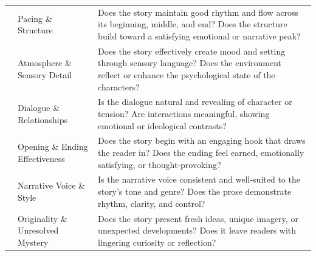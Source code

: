\documentclass{article}
\theoremstyle{plain}
\theoremstyle{definition}
\theoremstyle{remark}
\begin{document}
\begin{table}[t]
\begin{tabular}{clp{10cm}}
\addlinespace
700 & Pacing \& Structure & Does the story maintain good rhythm and flow across its beginning, middle, and end? Does the structure build toward a satisfying emotional or narrative peak? \\
\addlinespace
800 & Atmosphere \& Sensory Detail & Does the story effectively create mood and setting through sensory language? Does the environment reflect or enhance the psychological state of the characters? \\
\addlinespace
900 & Dialogue \& Relationships & Is the dialogue natural and revealing of character or tension? Are interactions meaningful, showing emotional or ideological contrasts? \\
\addlinespace
1000 & Opening \& Ending Effectiveness & Does the story begin with an engaging hook that draws the reader in? Does the ending feel earned, emotionally satisfying, or thought-provoking? \\
\addlinespace
1100 & Narrative Voice \& Style & Is the narrative voice consistent and well-suited to the story's tone and genre? Does the prose demonstrate rhythm, clarity, and control? \\
\addlinespace
1200 & Originality \& Unresolved Mystery & Does the story present fresh ideas, unique imagery, or unexpected developments? Does it leave readers with lingering curiosity or reflection? \\
\bottomrule
\end{tabular}
\label{tab:rubric-criteria}
\end{table}
\end{document}
